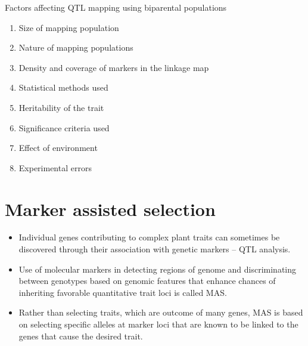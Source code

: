 \documentclass[11pt,dvipsnames,ignorenonframetext,aspectratio=169]{beamer}
\providecommand{\tightlist}{%
  \setlength{\itemsep}{0pt}\setlength{\parskip}{0pt}}
\begin{document}
\begin{frame}{Factors affecting QTL mapping using biparental
populations}
\protect\hypertarget{factors-affecting-qtl-mapping-using-biparental-populations}{}
\begin{enumerate}
\tightlist
\item
  Size of mapping population
\item
  Nature of mapping populations
\item
  Density and coverage of markers in the linkage map
\item
  Statistical methods used
\item
  Heritability of the trait
\item
  Significance criteria used
\item
  Effect of environment
\item
  Experimental errors
\end{enumerate}
\end{frame}

\hypertarget{marker-assisted-selection}{%
\section{Marker assisted selection}\label{marker-assisted-selection}}

\begin{frame}{}
\protect\hypertarget{section-9}{}
\begin{itemize}
\tightlist
\item
  Individual genes contributing to complex plant traits can sometimes be
  discovered through their association with genetic markers --
  \alert{QTL analysis}.
\item
  Use of molecular markers in detecting regions of genome and
  discriminating between genotypes based on genomic features that
  enhance chances of inheriting favorable quantitative trait loci is
  called MAS.
\item
  Rather than selecting traits, which are outcome of many genes, MAS is
  based on selecting specific alleles at marker loci that are known to
  be linked to the genes that cause the desired trait.
\end{itemize}
\end{frame}
\end{document}
